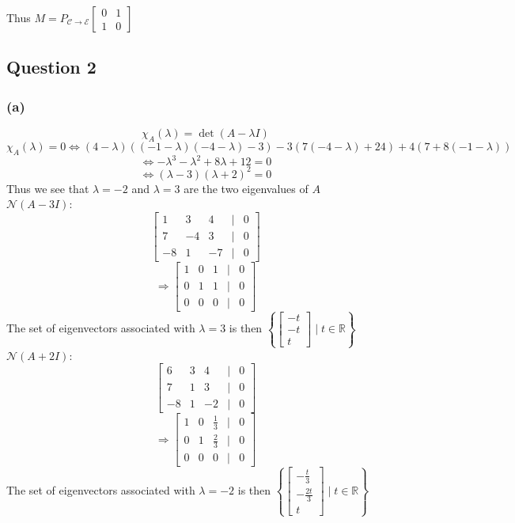 \documentclass{article}
\begin{document}
Thus \(M =  P_{\mathcal{C} \rightarrow \mathcal{E}}\begin{bmatrix}
    0 & 1 \\
    1 & 0
\end{bmatrix}\)


\subsection*{Question 2}
\subsubsection*{(a)}
\[
\chi_A(\lambda) = \det(A - \lambda I)
\]
\[
\chi_A(\lambda) = 0 \iff (4-\lambda)((-1-\lambda)(-4 - \lambda) - 3) -3(7(-4-\lambda) +24) + 4(7 + 8(-1-\lambda))
\]
\[
\iff - \lambda^3 - \lambda^2 + 8 \lambda +12 = 0
\]
\[
\iff (\lambda -3)(\lambda +2)^2 = 0
\]
Thus we see that \(\lambda = -2\) and \(\lambda = 3\) are the two eigenvalues of \(A\)
\\

\(\mathcal{N}(A - 3I)\):
\[
\begin{bmatrix}
    1 & 3 & 4 & | & 0  \\
    7 & -4 & 3 & | & 0 \\
    -8 & 1 & -7 & | & 0 
\end{bmatrix}
\]
\[
 \Rightarrow \begin{bmatrix}
    1 & 0 & 1 & | & 0 \\
    0 & 1 & 1 & | & 0 \\
    0 & 0 & 0 & | & 0 
\end{bmatrix}
\]
The set of eigenvectors associated with \(\lambda = 3\) is then \(\left\{\begin{bmatrix}
    -t \\ -t \\ t
\end{bmatrix}\mid t \in \mathbb{R} \right\}\)
\\

\(\mathcal{N}(A + 2I)\):
\[
\begin{bmatrix}
    6 & 3 & 4 & | & 0 \\
    7 & 1 & 3 & | & 0 \\
    -8 & 1 & -2 & | & 0 
\end{bmatrix}
\]
\[
\Rightarrow \begin{bmatrix}
    1 & 0 & \frac{1}{3} & | & 0 \\
    0 & 1 & \frac{2}{3} & | & 0 \\
    0 & 0 & 0 & | & 0
\end{bmatrix}
\]
The set of eigenvectors associated with \(\lambda = -2\) is then \(\left\{\begin{bmatrix}
    -\frac{t}{3} \\ -\frac{2t}{3} \\ t
\end{bmatrix} \mid t \in \mathbb{R} \right\}\)
\\
\end{document}
